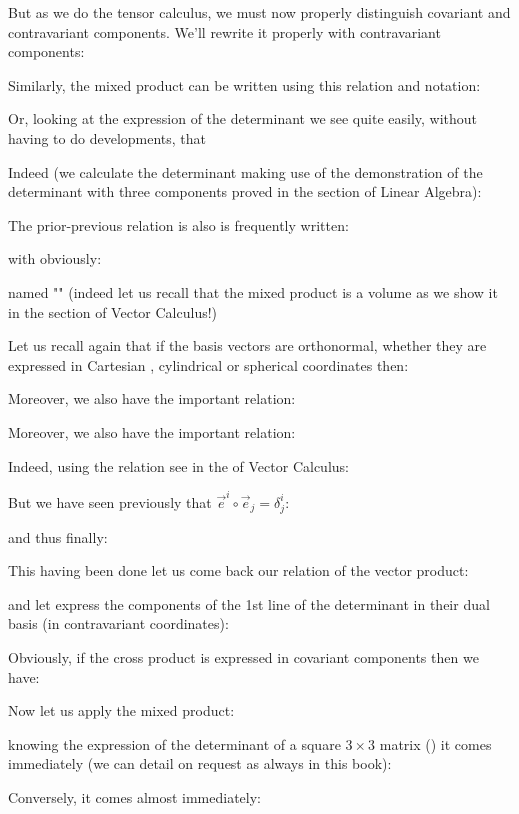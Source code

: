 	But as we do the tensor calculus, we must now properly distinguish covariant and contravariant components. We'll rewrite it properly with contravariant components:
	
	Similarly, the mixed product can be written using this relation and notation:
	
	Or, looking at the expression of the determinant we see quite easily, without having to do developments, that
	
	Indeed (we calculate the determinant making use of the demonstration of the determinant with three components proved in the section of Linear Algebra):
	
	The prior-previous relation is also is frequently written:
	
	with obviously:
	
	named "" (indeed let us recall that the mixed product is a volume as we show it in the section of Vector Calculus!)
	\begin{tcolorbox}[title=Remark,colframe=black,arc=10pt]
	Let us recall again that if the basis vectors are orthonormal, whether they are expressed in Cartesian , cylindrical or spherical coordinates then:
	
	\end{tcolorbox}
	Moreover, we also have the important relation:
	
	Moreover, we also have the important relation:
	
	Indeed, using the relation see in the of Vector Calculus:
	
	But we have seen previously that $\vec{e}^i\circ\vec{e}_j=\delta_j^i$:
	
	and thus finally:
	
	This having been done let us come back our relation of the vector product:
	
	and let express the components of the 1st line of the determinant in their dual basis (in contravariant coordinates):
	
	Obviously, if the cross product is expressed in covariant components then we have:
	
	Now let us apply the mixed product:
	
	knowing the expression of the determinant of a square $3\times 3$ matrix  () it comes immediately (we can detail on request as always in this book):
	
	Conversely, it comes almost immediately:
	
